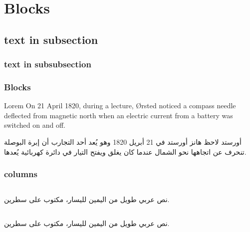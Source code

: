 \documentclass{beamer}
\begin{document}
\section{Blocks}

\subsection{text in subsection}
\subsubsection{text in subsubsection}

\begin{frame}
\frametitle{Blocks}


\begin{block}{Lorem}
  \foreignlanguage*{nil}{On 21 April 1820, during a lecture, Ørsted
  noticed a compass\cite{Dijkstra1982} needle deflected from magnetic north when an
  electric current from a battery was switched on and off.}
\end{block}


\begin{block}{أورستد}
  لاحظ هانز أورستد في 21 أبريل 1820 وهو يُعد أحد التجارب أن إبرة
  البوصلة تنحرف عن اتجاهها نحو الشمال عندما كان يغلق ويفتح التيار في
  دائرة كهربائية يُعدها.
\end{block}
\end{frame}

\begin{frame}
\frametitle{columns}
\begin{columns}[t]
\begin{column}{5cm}
نص عربي طويل من اليمين لليسار، مكتوب على سطرين.
\end{column}
\begin{column}{5cm}
\end{column}
\end{columns}

\bigskip

\begin{columns}[b]
\begin{column}{5cm}
نص عربي طويل من اليمين لليسار، مكتوب على سطرين.
\end{column}
\begin{column}{5cm}
\end{column}
\end{columns}
\end{frame}
\end{document}
